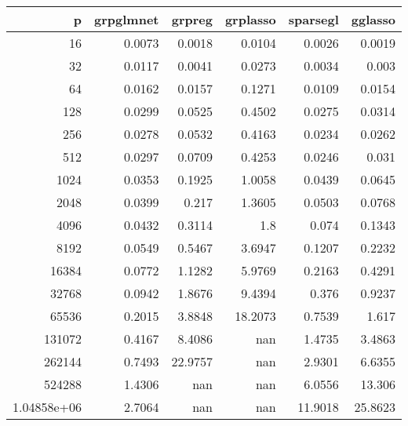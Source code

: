 \begin{tabular}{rrrrrr}
\hline
                p &   grpglmnet &   grpreg &   grplasso &   sparsegl &   gglasso \\
\hline
     16           &      0.0073 &   0.0018 &     0.0104 &     0.0026 &    0.0019 \\
     32           &      0.0117 &   0.0041 &     0.0273 &     0.0034 &    0.003  \\
     64           &      0.0162 &   0.0157 &     0.1271 &     0.0109 &    0.0154 \\
    128           &      0.0299 &   0.0525 &     0.4502 &     0.0275 &    0.0314 \\
    256           &      0.0278 &   0.0532 &     0.4163 &     0.0234 &    0.0262 \\
    512           &      0.0297 &   0.0709 &     0.4253 &     0.0246 &    0.031  \\
   1024           &      0.0353 &   0.1925 &     1.0058 &     0.0439 &    0.0645 \\
   2048           &      0.0399 &   0.217  &     1.3605 &     0.0503 &    0.0768 \\
   4096           &      0.0432 &   0.3114 &     1.8    &     0.074  &    0.1343 \\
   8192           &      0.0549 &   0.5467 &     3.6947 &     0.1207 &    0.2232 \\
  16384           &      0.0772 &   1.1282 &     5.9769 &     0.2163 &    0.4291 \\
  32768           &      0.0942 &   1.8676 &     9.4394 &     0.376  &    0.9237 \\
  65536           &      0.2015 &   3.8848 &    18.2073 &     0.7539 &    1.617  \\
 131072           &      0.4167 &   8.4086 &   nan      &     1.4735 &    3.4863 \\
 262144           &      0.7493 &  22.9757 &   nan      &     2.9301 &    6.6355 \\
 524288           &      1.4306 & nan      &   nan      &     6.0556 &   13.306  \\
      1.04858e+06 &      2.7064 & nan      &   nan      &    11.9018 &   25.8623 \\
\hline
\end{tabular}